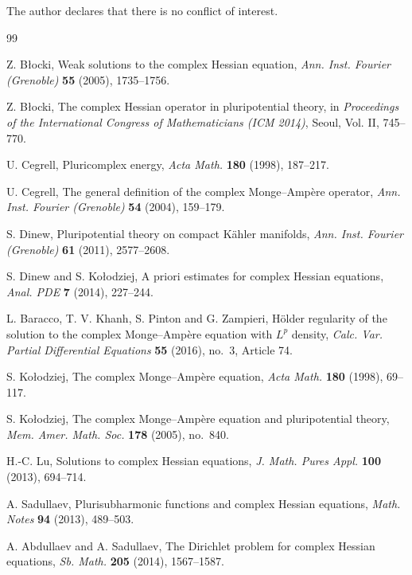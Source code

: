 \documentclass[11pt,reqno]{amsart}
\theoremstyle{definition}
\theoremstyle{remark}
\begin{document}
	The author declares that there is no conflict of interest.
	\begin{thebibliography}{99}
		
		Z. B{\l}ocki,
		Weak solutions to the complex Hessian equation,
		\emph{Ann. Inst. Fourier (Grenoble)} \textbf{55} (2005), 1735--1756.
		
		Z. B{\l}ocki,
		The complex Hessian operator in pluripotential theory,
		in \emph{Proceedings of the International Congress of Mathematicians (ICM 2014)}, 
		Seoul, Vol. II, 745--770.
		
		U. Cegrell,
		Pluricomplex energy,
		\emph{Acta Math.} \textbf{180} (1998), 187--217.
		
		U. Cegrell,
		The general definition of the complex Monge--Amp\`ere operator,
		\emph{Ann. Inst. Fourier (Grenoble)} \textbf{54} (2004), 159--179.
		
		S. Dinew,
		Pluripotential theory on compact K\"ahler manifolds,
		\emph{Ann. Inst. Fourier (Grenoble)} \textbf{61} (2011), 2577--2608.
		
		S. Dinew and S. Ko{\l}odziej,
		A priori estimates for complex Hessian equations,
		\emph{Anal. PDE} \textbf{7} (2014), 227--244.
		
		L. Baracco, T. V. Khanh, S. Pinton and G. Zampieri,
		H\"older regularity of the solution to the complex Monge--Amp\`ere equation with $L^p$ density,
		\emph{Calc. Var. Partial Differential Equations} \textbf{55} (2016), no.~3, Article 74.
		
		S. Ko{\l}odziej,
		The complex Monge--Amp\`ere equation,
		\emph{Acta Math.} \textbf{180} (1998), 69--117.
		
		S. Ko{\l}odziej,
		The complex Monge--Amp\`ere equation and pluripotential theory,
		\emph{Mem. Amer. Math. Soc.} \textbf{178} (2005), no.~840.
		
		H.-C. Lu,
		Solutions to complex Hessian equations,
		\emph{J. Math. Pures Appl.} \textbf{100} (2013), 694--714.
		
		A. Sadullaev,
		Plurisubharmonic functions and complex Hessian equations,
		\emph{Math. Notes} \textbf{94} (2013), 489--503.
		
		A. Abdullaev and A. Sadullaev,
		The Dirichlet problem for complex Hessian equations,
		\emph{Sb. Math.} \textbf{205} (2014), 1567--1587.
		

\end{thebibliography}
\end{document}
